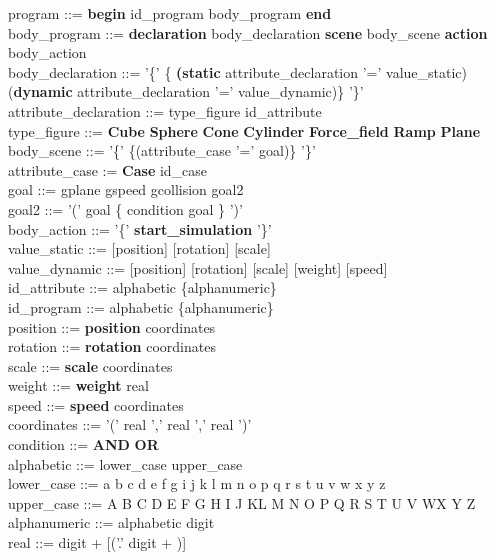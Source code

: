 \documentclass[12pt]{article}
\begin{document}
\noindent program ::= \textbf{begin} id\_program body\_program \textbf{end}\\
body\_program ::= \textbf{declaration} body\_declaration \textbf{scene} body\_scene \textbf{action} body\_action\\
body\_declaration ::= '\{' \{ \textbf{(static} attribute\_declaration '=' value\_static) \textbar (\textbf{dynamic} attribute\_declaration '=' value\_dynamic)\}  '\}'\\
attribute\_declaration ::= type\_figure id\_attribute\\
type\_figure ::= \textbf{Cube} \textbar \textbf{Sphere} \textbar \textbf{Cone} \textbar \textbf{Cylinder} \textbar \textbf{Force\_field} \textbar \textbf{Ramp} \textbar  \textbf{Plane}\\
body\_scene ::= '\{' \{(attribute\_case '=' goal)\} '\}'\\
attribute\_case := \textbf{Case} id\_case\\
goal ::=  gplane \textbar gspeed \textbar gcollision \textbar goal2\\
goal2 ::= '(' goal \{ condition goal \} ')'\\
body\_action ::= '\{' \textbf{start\_simulation} '\}'\\
value\_static ::= [position] [rotation] [scale]\\
value\_dynamic ::= [position] [rotation] [scale] [weight] [speed]\\
id\_attribute ::= alphabetic \{alphanumeric\}\\
id\_program ::= alphabetic \{alphanumeric\}\\
position ::= \textbf{position} coordinates\\
rotation ::= \textbf{rotation} coordinates\\
scale ::=  \textbf{scale} coordinates\\
weight ::= \textbf{weight} real\\
speed ::= \textbf{speed} coordinates\\
coordinates ::= '(' real ',' real ','  real ')'\\
condition ::= \textbf{AND} \textbar \textbf{OR}\\
alphabetic ::= lower\_case  \textbar  upper\_case\\
lower\_case ::= a \textbar b \textbar c \textbar d \textbar e \textbar f \textbar g \textbar i \textbar j \textbar k \textbar l \textbar m \textbar n \textbar o \textbar p \textbar q \textbar r \textbar s \textbar t \textbar u \textbar v \textbar w \textbar x \textbar y \textbar z\\
upper\_case ::= A \textbar B \textbar C \textbar D \textbar E \textbar F \textbar G \textbar H \textbar I \textbar J \textbar K\textbar L \textbar M \textbar N \textbar O \textbar P \textbar Q \textbar R \textbar S \textbar T \textbar U \textbar V \textbar W\textbar X \textbar Y \textbar Z\\
alphanumeric ::= alphabetic \textbar digit\\
real ::= digit + [('.' digit + )]
\end{document}
